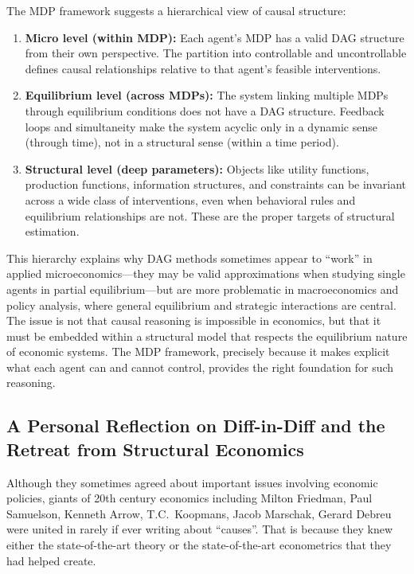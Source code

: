 \documentclass[12pt]{article}
\begin{document}
The MDP framework suggests a hierarchical view of causal structure:
\begin{enumerate}
\item \textbf{Micro level (within MDP):} Each agent's MDP has a valid DAG structure from their own perspective. The partition into controllable and uncontrollable defines causal relationships relative to that agent's feasible interventions.

\item \textbf{Equilibrium level (across MDPs):} The system linking multiple MDPs through equilibrium conditions does not have a DAG structure. Feedback loops and simultaneity make the system acyclic only in a dynamic sense (through time), not in a structural sense (within a time period).

\item \textbf{Structural level (deep parameters):} Objects like utility functions, production functions, information structures, and constraints can be invariant across a wide class of interventions, even when behavioral rules and equilibrium relationships are not. These are the proper targets of structural estimation.
\end{enumerate}

This hierarchy explains why DAG methods sometimes appear to ``work'' in applied microeconomics---they may be valid approximations when studying single agents in partial equilibrium---but are more problematic in macroeconomics and policy analysis, where general equilibrium and strategic interactions are central. The issue is not that causal reasoning is impossible in economics, but that it must be embedded within a structural model that respects the equilibrium nature of economic systems. The MDP framework, precisely because it makes explicit what each agent can and cannot control, provides the right foundation for such reasoning.


\subsection{A Personal Reflection on Diff-in-Diff and the Retreat from Structural Economics}

Although they sometimes agreed about important issues involving economic policies, giants of 20th century economics including Milton Friedman, Paul Samuelson, Kenneth Arrow, T.C.\ Koopmans, Jacob Marschak, Gerard Debreu were united in rarely if ever writing about ``causes''. That is because they knew either the state-of-the-art theory or the state-of-the-art econometrics that they had helped create.
\end{document}
